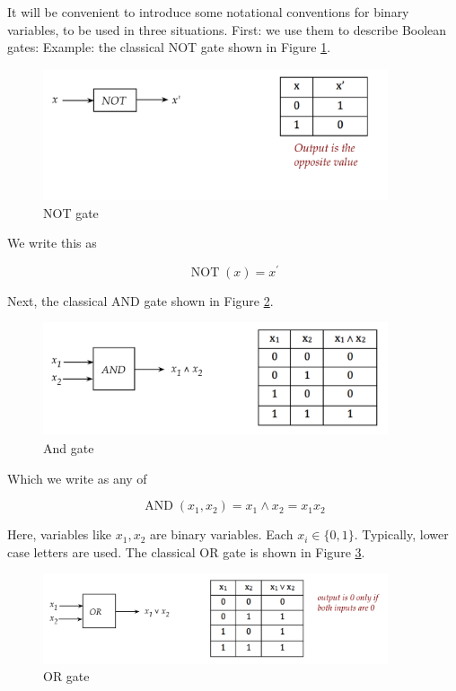 \documentclass[main.tex]{subfiles}
\begin{document}
    It will be convenient to introduce some notational conventions for binary variables, to be used in three situations. First: we use them to describe Boolean gates: Example: the classical NOT gate shown in Figure \ref{fig:04classical-not}.
    
    \begin{figure}
        \centering
        \includegraphics[width=4in]{notes/figs/n10/04classical-not.png}
        \caption{NOT gate}
        \label{fig:04classical-not}
    \end{figure}
    
    We write this as
    
    $$
    \operatorname{NOT}(x)=x^{\prime}
    $$
    
    Next, the classical AND gate shown in Figure \ref{fig:05classical-and}.
    
    \begin{figure}
        \centering
        \includegraphics[width=4in]{notes/figs/n10/05classical-and.png}
        \caption{And gate}
        \label{fig:05classical-and}
    \end{figure}
    
    Which we write as any of
    
    $$
    \operatorname{AND}\left(x_{1}, x_{2}\right)=x_{1} \wedge x_{2}=x_{1} x_{2}
    $$
    
    Here, variables like $x_{1}, x_{2}$ are binary variables. Each $x_{i} \in\{0,1\}$. Typically, lower case letters are used. The classical OR gate is shown in Figure \ref{fig:06classical-or}.
    
    \begin{figure}
        \centering
        \includegraphics[width=4in]{notes/figs/n10/06classical-or.png}
        \caption{OR gate}
        \label{fig:06classical-or}
    \end{figure}
    
\end{document}
